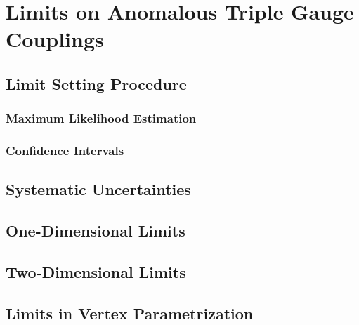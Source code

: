 \chapter{Limits on Anomalous Triple Gauge Couplings}
\label{chap::LimitsonATGCs}

\section{Limit Setting Procedure}
\subsection{Maximum Likelihood Estimation}
\subsection{Confidence Intervals}
\section{Systematic Uncertainties}
\label{sec:systematics}
\section{One-Dimensional Limits}
\section{Two-Dimensional Limits}
\section{Limits in Vertex Parametrization}